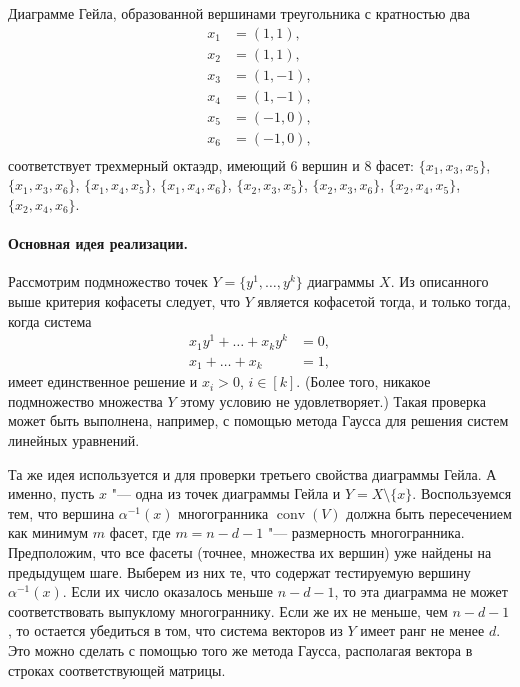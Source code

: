 \documentclass[12pt]{article}
\DeclareMathOperator{\conv}{conv}
\begin{document}
Диаграмме Гейла, образованной вершинами треугольника с кратностью два
\[
\begin{aligned}
x_1 &= (1,  1), \\
x_2 &= (1,  1), \\
x_3 &= (1, -1), \\
x_4 &= (1, -1), \\
x_5 &= (-1, 0), \\
x_6 &= (-1, 0), \\
\end{aligned}
\]
соответствует трехмерный октаэдр, имеющий 6 вершин и 8 фасет: $\{x_1, x_3, x_5\}$, $\{x_1, x_3, x_6\}$, $\{x_1, x_4, x_5\}$, $\{x_1, x_4, x_6\}$, $\{x_2, x_3, x_5\}$, $\{x_2, x_3, x_6\}$, $\{x_2, x_4, x_5\}$, $\{x_2, x_4, x_6\}$. 


\paragraph{Основная идея реализации.}
Рассмотрим подмножество точек $Y = \{y^1, \dots, y^k\}$ диаграммы $X$.
Из описанного выше критерия кофасеты следует, что $Y$ является кофасетой тогда, и только тогда, когда система
\begin{align*}
x_1 y^1 + \dots + x_k y^k &= 0, \\
x_1 + \dots + x_k &= 1,
\end{align*}
имеет единственное решение и $x_i > 0$, $i \in [k]$.
(Более того, никакое подмножество множества $Y$ этому условию не удовлетворяет.)
Такая проверка может быть выполнена, например, с помощью метода Гаусса для решения систем линейных уравнений.

Та же идея используется и для проверки третьего свойства диаграммы Гейла. А именно, пусть $x$ "--- одна из точек диаграммы Гейла и $Y = X \setminus \{x\}$.
Воспользуемся тем, что вершина $\alpha^{-1}(x)$ многогранника 
$\conv(V)$ должна быть пересечением как минимум $m$ фасет, где $m = n - d - 1$ "--- размерность многогранника. Предположим, что все фасеты (точнее, множества их вершин) уже найдены на предыдущем шаге. Выберем из них те, что содержат тестируемую вершину $\alpha^{-1}(x)$. Если их число оказалось меньше $n - d - 1$, то эта диаграмма не может соответствовать выпуклому многограннику. Если же их не меньше, чем $n - d - 1$, то остается убедиться в том, что система векторов из $Y$ имеет ранг не менее $d$. Это можно сделать с помощью того же метода Гаусса, располагая вектора в строках соответствующей матрицы.
\end{document}
